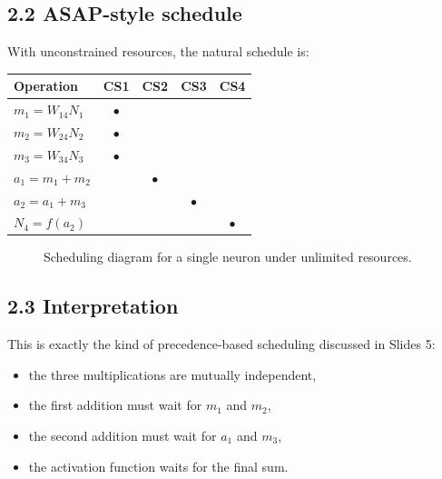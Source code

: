 \documentclass[11pt,a4paper]{article}
\begin{document}
\subsection*{2.2 ASAP-style schedule}
With unconstrained resources, the natural schedule is:
\begin{center}
\begin{tabular}{lcccc}
\toprule
Operation & CS1 & CS2 & CS3 & CS4 \\
\midrule
$m_1=W_{14}N_1$ & $\bullet$ & & & \\
$m_2=W_{24}N_2$ & $\bullet$ & & & \\
$m_3=W_{34}N_3$ & $\bullet$ & & & \\
$a_1=m_1+m_2$ & & $\bullet$ & & \\
$a_2=a_1+m_3$ & & & $\bullet$ & \\
$N_4=f(a_2)$ & & & & $\bullet$ \\
\bottomrule
\end{tabular}
\end{center}

\begin{figure}[h!]
\centering
{}
\caption{Scheduling diagram for a single neuron under unlimited resources.}
\end{figure}

\subsection*{2.3 Interpretation}
This is exactly the kind of precedence-based scheduling discussed in Slides 5:
\begin{itemize}
  \item the three multiplications are mutually independent,
  \item the first addition must wait for $m_1$ and $m_2$,
  \item the second addition must wait for $a_1$ and $m_3$,
  \item the activation function waits for the final sum.
\end{itemize}
\end{document}

